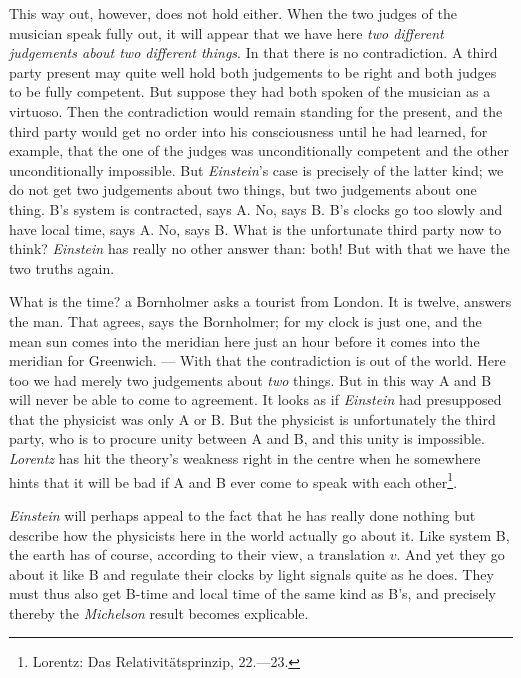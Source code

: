 \documentclass[12pt,a4paper]{article}
\begin{document}
This way out, however, does not hold either. When the two judges of the
musician speak fully out, it will appear that we have here \emph{two different
judgements about two different things}. In that there is no contradiction. A
third party present may quite well hold both judgements to be right and both
judges to be fully competent. But suppose they had both spoken of the musician
as a virtuoso. Then the contradiction would remain standing for the present,
and the third party would get no order into his consciousness until he had
learned, for example, that the one of the judges was unconditionally competent
and the other unconditionally impossible. But \emph{Einstein}'s case is
precisely of the latter kind; we do not get two judgements about two things,
but two judgements about one thing. B's system is contracted, says A. No, says
B. B's clocks go too slowly and have local time, says A. No, says B. What is
the unfortunate third party now to think? \emph{Einstein} has really no other
answer than: both! But with that we have the two truths again.

What is the time? a Bornholmer asks a tourist from London. It is twelve,
answers the man. That agrees, says the Bornholmer; for my clock is just one,
and the mean sun comes into the meridian here just an hour before it comes
into the meridian for Greenwich. --- With that the contradiction is out of the
world. Here too we had merely two judgements about \emph{two} things. But in
this way A and B will never be able to come to agreement. It looks as if
\emph{Einstein} had presupposed that the physicist was only A or B. But the
physicist is unfortunately the third party, who is to procure unity between A
and B, and this unity is impossible. \emph{Lorentz} has hit the theory's
weakness right in the centre when he somewhere hints that it will be bad if A
and B ever come to speak with each other\footnote{Lorentz: Das
Relativitätsprinzip, 22.---23.}.

\emph{Einstein} will perhaps appeal to the fact that he has really done
nothing but describe how the physicists here in the world actually go about
it. Like system B, the earth has of course, according to their view, a
translation $v$. And yet they go about it like B and regulate their clocks by
light signals quite as he does. They must thus also get B-time and local time
of the same kind as B's, and precisely thereby the \emph{Michelson} result
becomes explicable.
\end{document}
